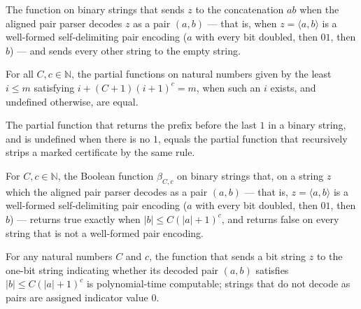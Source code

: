 \begin{definition}
\label{Complexity.verifier_concat}
\leanok
{}
The function on binary strings that sends $z$ to the concatenation $ab$ when the
aligned pair parser decodes $z$ as a pair $(a, b)$ --- that is, when
$z = \langle a, b\rangle$ is a well-formed self-delimiting pair encoding ($a$ with
every bit doubled, then $01$, then $b$) --- and sends every other string to the
empty string.
\end{definition}

\begin{lemma}
\label{Complexity.verifier_split_bridge}
\leanok
{}
For all $C,c\in\mathbb{N}$, the partial functions on natural numbers given by the least
$i\le m$ satisfying $i+(C+1)(i+1)^c=m$, when such an $i$ exists, and undefined
otherwise, are equal.
\end{lemma}

\begin{lemma}
\label{Complexity.verifier_strip_bridge}
\leanok
{}
The partial function that returns the prefix before the last $1$ in a binary string, and
is undefined when there is no $1$, equals the partial function that recursively strips a
marked certificate by the same rule.
\end{lemma}

\begin{definition}
\label{Complexity.verifier_bound}
\leanok
{}
For $C, c \in \mathbb{N}$, the Boolean function $\beta_{C,c}$ on binary strings
that, on a string $z$ which the aligned pair parser decodes as a pair $(a, b)$ ---
that is, $z = \langle a, b\rangle$ is a well-formed self-delimiting pair encoding
($a$ with every bit doubled, then $01$, then $b$) --- returns true exactly when
$|b| \le C(|a|+1)^c$, and returns false on every string that is not a
well-formed pair encoding.
\end{definition}

\begin{lemma}
\label{Complexity.verifier_poly_bound}
\leanok
{}
For any natural numbers $C$ and $c$, the function that sends a bit string $z$ to the
one-bit string indicating whether its decoded pair $(a,b)$ satisfies $|b|\le C(|a|+1)^c$
is polynomial-time computable; strings that do not decode as pairs are assigned
indicator value $0$.
\end{lemma}


